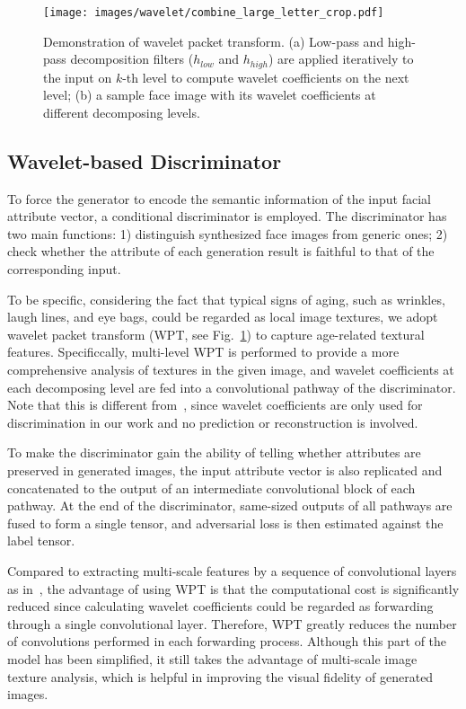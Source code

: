 \documentclass[10pt,twocolumn,letterpaper]{article}
\begin{document}
\begin{figure}[t]
\centering\texttt{[image: images/wavelet/combine\_large\_letter\_crop.pdf]}
\caption{Demonstration of wavelet packet transform. (a) Low-pass and high-pass decomposition filters ($h_{low}$ and $h_{high}$) are applied iteratively to the input on $k$-th level to compute wavelet coefficients on the next level; (b) a sample face image with its wavelet coefficients at different decomposing levels.} 
\label{fig:waveletPacketTransform}
\end{figure}

\subsection{Wavelet-based Discriminator}
To force the generator to encode the semantic information of the input facial attribute vector, a conditional discriminator is employed. The discriminator has two main functions: 1) distinguish synthesized face images from generic ones; 2) check whether the attribute of each generation result is faithful to that of the corresponding input.

To be specific, considering the fact that typical signs of aging, such as wrinkles, laugh lines, and eye bags, could be regarded as local image textures, we adopt wavelet packet transform (WPT, see Fig.~\ref{fig:waveletPacketTransform}) to capture age-related textural features.
Specificcally, multi-level WPT is performed to provide a more comprehensive analysis of textures in the given image, and wavelet coefficients at each decomposing level are fed into a convolutional pathway of the discriminator. 
Note that this is different from~\cite{li2018wavelet}, since wavelet coefficients are only used for discrimination in our work and no prediction or reconstruction is involved.

To make the discriminator gain the ability of telling whether attributes are preserved in generated images, the input attribute vector is also replicated and concatenated to the output of an intermediate convolutional block of each pathway.
At the end of the discriminator, same-sized outputs of all pathways are fused to form a single tensor, and adversarial loss is then estimated against the label tensor.

Compared to extracting multi-scale features by a sequence of convolutional layers as in~\cite{yang2017learning}, the advantage of using WPT is that the computational cost is significantly reduced since calculating wavelet coefficients could be regarded as forwarding through a single convolutional layer. 
Therefore, WPT greatly reduces the number of convolutions performed in each forwarding process.
Although this part of the model has been simplified, it still takes the advantage of multi-scale image texture analysis, which is helpful in improving the visual fidelity of generated images. 
\end{document}
